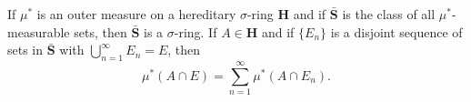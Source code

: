 If $\mu^*$ is an outer measure on a hereditary $\sigma$-ring $\mathbf{H}$ and if $\bar{\mathbf{S}}$ is the class of all $\mu^*$-measurable sets, then $\bar{\mathbf{S}}$ is a $\sigma$-ring. If $A \in \mathbf{H}$ and if $\{E_n\}$ is a disjoint sequence of sets in $\bar{\mathbf{S}}$ with $\bigcup_{n=1}^{\infty} E_n = E$, then
$$\mu^*(A \cap E) = \sum_{n=1}^{\infty} \mu^*(A \cap E_n).$$
